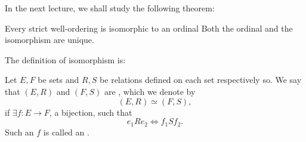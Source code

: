 \documentclass[notoc,notitlepage]{tufte-book}
\begin{document}
In the next lecture, we shall study the following theorem:

\begin{thmnonum}
  Every strict well-ordering is isomorphic to an ordinal Both the ordinal and the isomorphism are unique.
\end{thmnonum}

The definition of isomorphism is:

\begin{defn}[Isomorphism]
\label{defn:isomorphism}
  Let $E, F$ be sets and $R, S$ be relations defined on each set respectively so. We say that $(E, R)$ and $(F, S)$ are , which we denote by
  \begin{equation*}
    (E, R) \simeq (F, S),
  \end{equation*}
  if $\exists f : E \to F$, a bijection, such that
  \begin{equation*}
    e_1 R e_2 \iff f_1 S f_2.
  \end{equation*}
  Such an $f$ is called an .
\end{defn}



\appendix

\backmatter

\pagestyle{plain}

\nobibliography*
% 

\printindex
\end{document}
